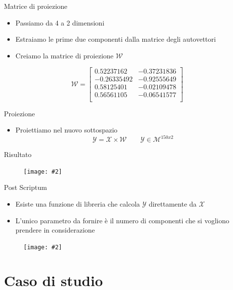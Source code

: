 \documentclass[xcolor={dvipsnames}]{beamer}
\newcommand{\codice}[2]{}
\newcommand{\figcen}[2]{
	\begin{figure}
		\begin{center}
			\texttt{[image: \#2]}
		\end{center}
	\end{figure}
}
\begin{document}
		\begin{frame}{Matrice di proiezione}
			\begin{itemize}
				\item Passiamo da 4 a 2 dimensioni
				\item Estraiamo le prime due componenti dalla matrice degli autovettori
			\end{itemize}
			\codice{125}{127}
			\begin{itemize}
				\item Creiamo la matrice di proiezione $\mathcal{W}$
			\end{itemize}
			$$\mathcal{W} = \begin{bmatrix}
			0.52237162 & -0.37231836\\
			-0.26335492 & -0.92555649\\
			0.58125401 & -0.02109478\\
			0.56561105 & -0.06541577\\
			\end{bmatrix}$$
		\end{frame}

		\begin{frame}{Proiezione}
			\begin{itemize}
				\item Proiettiamo nel nuovo sottospazio $$\mathcal{Y} = \mathcal{X}\times \mathcal{W} \qquad \mathcal{Y} \in \mathcal{M}^{150x2}$$
			\end{itemize}
			\codice{132}{133}
		\end{frame}
		
		\begin{frame}{Risultato}
			\figcen{.8\textwidth}{PCA}
		\end{frame}
		
		\begin{frame}{Post Scriptum}
			\begin{itemize}
				\item Esiste una funzione di libreria che calcola $\mathcal{Y}$ direttamente da $\mathcal{X}$
				\item L'unico parametro da fornire è il numero di componenti che si vogliono prendere in considerazione
			\end{itemize}
			\codice{149}{151}
			\figcen{.3\textwidth}{ok}
		\end{frame}

\section{Caso di studio}
\end{document}
